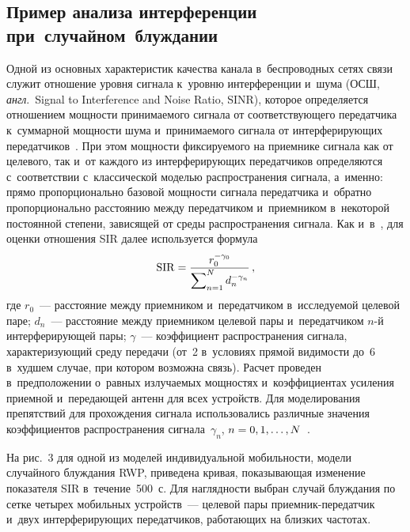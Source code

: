 \begin{multicols}{2}
\section{Пример анализа интерференции при~случайном~блуждании} 
  
  Одной из основных характеристик качества канала в~беспроводных сетях 
связи служит отношение уров\-ня сигнала к~уров\-ню интерференции и~шума 
(ОСШ, \textit{англ}.\ Signal to Interference and Noise Ratio, SINR), которое 
определяется отношением мощ\-ности принимаемого сигнала от 
соответствующего передатчика к~суммарной мощ\-ности шума 
и~при\-ни\-ма\-емо\-го сигнала от интерферирующих передатчиков~\cite{12-sg}. 
При этом мощ\-ности фик\-си\-ру\-емо\-го на приемнике сигнала как от целевого, 
так и~от каждого из интерферирующих передатчиков определяются 
с~соответствии с~классической моделью распространения сигнала, а~именно: 
прямо пропорционально базовой мощ\-ности сигнала передатчика и~обратно 
пропорционально рас\-сто\-янию меж\-ду передатчиком и~приемником 
в~некоторой по\-сто\-ян\-ной степени, зависящей от среды рас\-про\-стра\-не\-ния 
сигнала. Как и~в~\cite{12-sg, 13-sg}, для оценки отношения SIR далее 
используется формула 
$$
\mathrm{SIR}= \displaystyle\frac{\displaystyle r_0^{-\gamma_0}\mathstrut}{\displaystyle \sum\nolimits^N_{n=1} 
d_n^{-\gamma_n}\mathstrut}\,,
$$
 где $r_0$~--- рас\-сто\-яние между приемником 
и~передатчиком в~ис\-сле\-ду\-емой целевой паре; $d_n$~--- рассто\-яние между 
приемником целевой пары и~передатчиком $n$-й ин\-тер\-фе\-ри\-ру\-ющей пары; 
$\gamma$~--- коэффициент распространения сигнала, ха\-рак\-те\-ри\-зу\-ющий 
среду передачи (от~2 в~условиях прямой ви\-ди\-мости до~6 в~худшем случае, 
при котором возможна связь). Расчет проведен в~предположении о~рав\-ных 
из\-лу\-ча\-емых мощностях и~коэффициентах усиления приемной и~пе\-ре\-да\-ющей 
антенн для всех устройств. Для моделирования препятствий для 
про\-хож\-де\-ния сигнала использовались различные значения коэффициентов 
рас\-про\-стра\-не\-ния сигнала~$\gamma_n$, $n\hm= 0,1,\ldots, N$~\cite{13-sg}.
  
  На рис.~3 для одной из моделей индивидуальной мо\-биль\-ности, модели 
случайного блуж\-да\-ния RWP, приведена кривая, по\-ка\-зы\-ва\-ющая изменение 
показателя SIR в~течение~500~с. Для на\-гляд\-ности вы\-бран случай блуж\-да\-ния 
по сетке четырех мобильных \mbox{устройств}~--- целевой пары  
при\-ем\-ник-пе\-ре\-дат\-чик и~двух интерферирующих передатчиков, 
работающих на близ\-ких час\-тотах.

\setcounter{figure}{3}
\begin{figure*}[b] %
\vspace*{1pt}
 \begin{center}
 \mbox{%
 \epsfxsize=162.925mm 
 }
 \end{center}
\vspace*{-11pt}
 \end{figure*}
  

\end{multicols}
